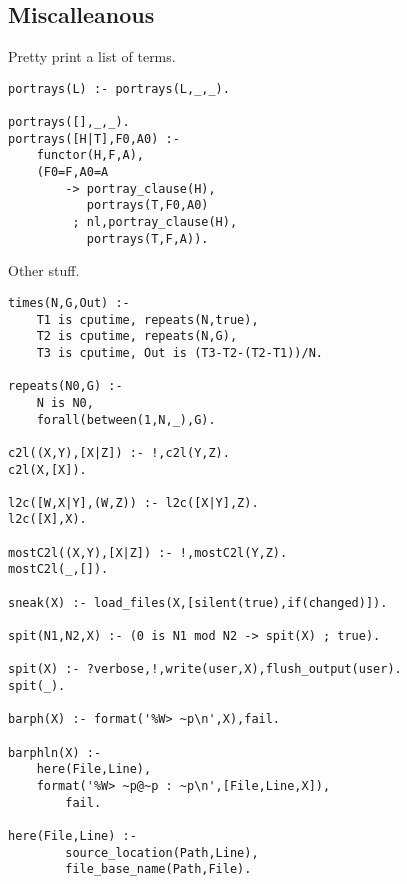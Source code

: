 \documentclass[twocolumn,10pt]{book}
\begin{document}
\subsection{ Miscalleanous
}
 Pretty print a list of terms.  \begin{Verbatim}
portrays(L) :- portrays(L,_,_).

portrays([],_,_).
portrays([H|T],F0,A0) :-
    functor(H,F,A),
    (F0=F,A0=A
        -> portray_clause(H),
           portrays(T,F0,A0)
         ; nl,portray_clause(H),
           portrays(T,F,A)).
\end{Verbatim}
 Other stuff.  \begin{Verbatim}
times(N,G,Out) :-
    T1 is cputime, repeats(N,true),
    T2 is cputime, repeats(N,G),
    T3 is cputime, Out is (T3-T2-(T2-T1))/N.

repeats(N0,G) :-
    N is N0,
    forall(between(1,N,_),G).

c2l((X,Y),[X|Z]) :- !,c2l(Y,Z).
c2l(X,[X]).

l2c([W,X|Y],(W,Z)) :- l2c([X|Y],Z).
l2c([X],X).

mostC2l((X,Y),[X|Z]) :- !,mostC2l(Y,Z).
mostC2l(_,[]).

sneak(X) :- load_files(X,[silent(true),if(changed)]).

spit(N1,N2,X) :- (0 is N1 mod N2 -> spit(X) ; true).

spit(X) :- ?verbose,!,write(user,X),flush_output(user).
spit(_).

barph(X) :- format('%W> ~p\n',X),fail.

barphln(X) :-
    here(File,Line),
    format('%W> ~p@~p : ~p\n',[File,Line,X]),
        fail.

here(File,Line) :-
        source_location(Path,Line),
        file_base_name(Path,File).
\end{Verbatim}
\end{document}
